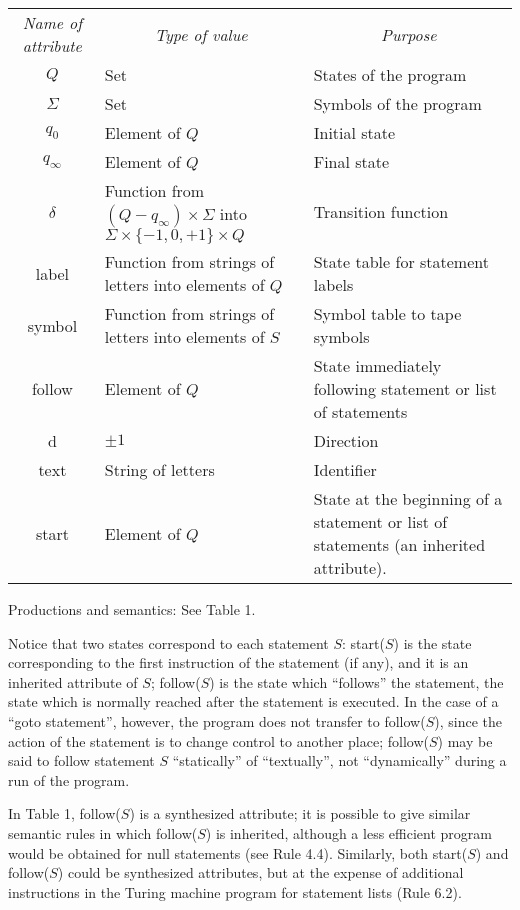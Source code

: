 \documentclass[a4paper]{article}
\begin{document}
\begin{tabular}{cp{5cm}p{5cm}}
\multicolumn{1}{c}{\emph{Name of attribute}} &
\multicolumn{1}{c}{\emph{Type of value}} &
\multicolumn{1}{c}{\emph{Purpose}} \\
$Q$ & Set & States of the program \\
$\Sigma$ & Set & Symbols of the program \\
$q_0$ & Element of $Q$ & Initial state \\
$q_\infty$ & Element of $Q$ & Final state \\
$\delta$ & Function from $(Q - q_\infty) \times \Sigma$ into $\Sigma \times
	\{-1,0,+1\} \times Q$ & Transition function \\
label & Function from strings of letters into elements of $Q$ & State table for
	statement labels \\
symbol & Function from strings of letters into elements of $S$ & Symbol table to
	tape symbols \\
follow & Element of $Q$ & State immediately following statement or list
	of statements \\
d & $\pm 1$ & Direction \\
text & String of letters & Identifier \\
start & Element of $Q$ & State at the beginning of a statement or list of
	statements (an inherited attribute).
\end{tabular}

Productions and semantics: See Table 1.

Notice that two states correspond to each statement $S$: start($S$) is the
state corresponding to the first instruction of the statement (if any), and it
is an inherited attribute of $S$; follow($S$) is the state which ``follows''
the statement, the state which is normally reached after the statement is
executed. In the case of a ``goto statement'', however, the program does not
transfer to follow($S$), since the action of the statement is to change control
to another place; follow($S$) may be said to follow statement $S$
``statically'' of ``textually'', not ``dynamically'' during a run of the
program.

In Table 1, follow($S$) is a synthesized attribute; it is possible to give
similar semantic rules in which follow($S$) is inherited, although a less
efficient program would be obtained for null statements (see Rule 4.4).
Similarly, both start($S$) and follow($S$) could be synthesized attributes, but
at the expense of additional instructions in the Turing machine program for
statement lists (Rule 6.2).
\end{document}
